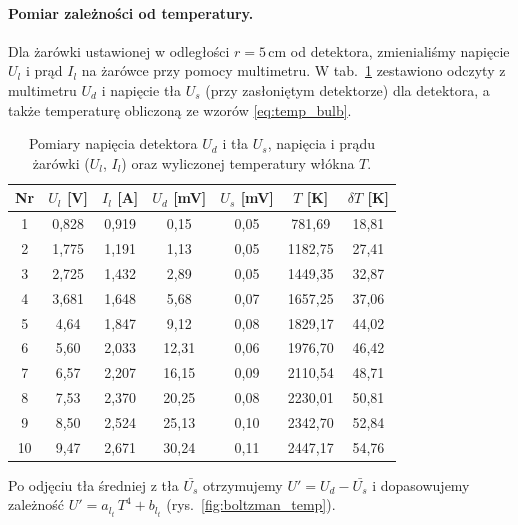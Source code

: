 \documentclass[12pt]{article}
\begin{document}
\paragraph{Pomiar zależności od temperatury.}
Dla żarówki ustawionej w odległości $r=5\,\mathrm{cm}$ od detektora, zmienialiśmy napięcie $U_l$ i prąd $I_l$ na żarówce przy pomocy multimetru. W tab.~\ref{tab:temp_measurements} zestawiono odczyty z multimetru $U_d$ i napięcie tła $U_s$ (przy zasłoniętym detektorze) dla detektora, a także temperaturę obliczoną ze wzorów \eqref{eq:temp_bulb}.

\begin{table}[H]
	\centering
	\begin{tabular}{c|cc|c|c|cc}
		\toprule
		Nr & $U_l$ [V] & $I_l$ [A] & $U_d$ [mV] & $U_s$ [mV] & $T$ [K] & $\delta T$ [K]\\
		\midrule
		1  & 0{,}828   & 0{,}919 & 0{,}15  & 0{,}05 & 781{,}69  & 18{,}81 \\
		2  & 1{,}775   & 1{,}191 & 1{,}13  & 0{,}05 & 1182{,}75 & 27{,}41 \\
		3  & 2{,}725   & 1{,}432 & 2{,}89  & 0{,}05 & 1449{,}35 & 32{,}87 \\
		4  & 3{,}681   & 1{,}648 & 5{,}68  & 0{,}07 & 1657{,}25 & 37{,}06 \\
		5  & 4{,}64    & 1{,}847 & 9{,}12  & 0{,}08 & 1829{,}17 & 44{,}02 \\
		6  & 5{,}60    & 2{,}033 & 12{,}31 & 0{,}06 & 1976{,}70 & 46{,}42 \\
		7  & 6{,}57    & 2{,}207 & 16{,}15 & 0{,}09 & 2110{,}54 & 48{,}71 \\
		8  & 7{,}53    & 2{,}370 & 20{,}25 & 0{,}08 & 2230{,}01 & 50{,}81 \\
		9  & 8{,}50    & 2{,}524 & 25{,}13 & 0{,}10 & 2342{,}70 & 52{,}84 \\
		10 & 9{,}47    & 2{,}671 & 30{,}24 & 0{,}11 & 2447{,}17 & 54{,}76 \\
		\bottomrule
	\end{tabular}
	\caption{Pomiary napięcia detektora $U_d$ i tła $U_s$, napięcia i prądu żarówki ($U_l$, $I_l$) oraz wyliczonej temperatury włókna $T$.}
	\label{tab:temp_measurements}
\end{table}

Po odjęciu tła średniej z tła $\bar{U_s}$ otrzymujemy $U' = U_d - \bar{U_s}$ i dopasowujemy zależność $U' = a_{l_t}\,T^4 + b_{l_t}$ (rys.~\ref{fig:boltzman_temp}).
\end{document}
